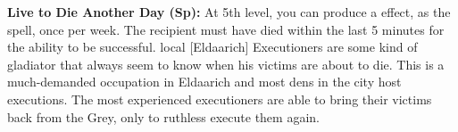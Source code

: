 {\textbf{Live to Die Another Day (Sp):} At 5th level, you can produce a  effect, as the spell, once per week. The recipient must have died within the last 5 minutes for the ability to be successful.
}
{}
{local [Eldaarich]}
{Executioners are some kind of gladiator that always seem to know when his victims are about to die.}
{This is a much-demanded occupation in Eldaarich and most dens in the city host executions.}
{The most experienced executioners are able to bring their victims back from the Grey, only to ruthless execute them again.}